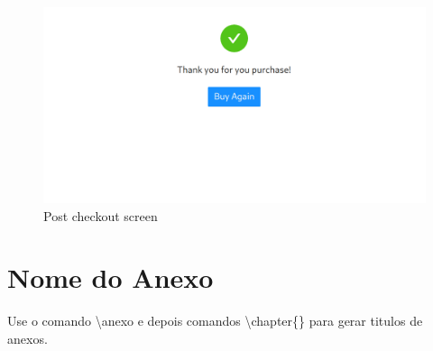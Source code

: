 \documentclass[openright]{normas-utf-tex} %
\begin{document}
\begin{figure}[H]
	\centering
	\includegraphics[width=1\textwidth]{./images/userapp5.png}
	\caption[]{Post checkout screen}
\end{figure}

\anexo
\chapter{Nome do Anexo}

Use o comando {\ttfamily \textbackslash anexo} e depois comandos {\ttfamily \textbackslash chapter\{\}}
para gerar titulos de anexos.
\end{document}
